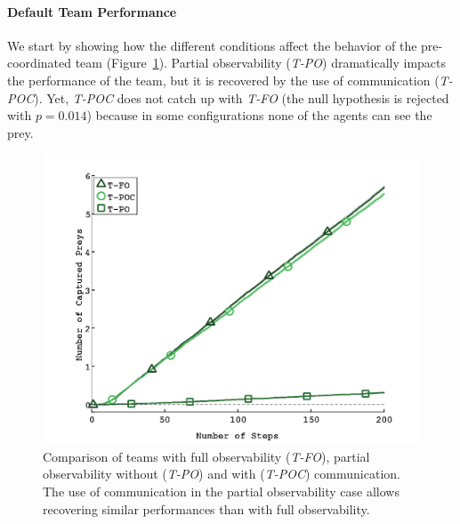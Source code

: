 
\paragraph{Default Team Performance}

We start by showing how the different conditions affect the behavior of the pre-coordinated team (Figure~\ref{fig:cmpteam}). Partial observability (\emph{T-PO}) dramatically impacts the performance of the team, but it is recovered by the use of communication (\emph{T-POC}). Yet, \emph{T-POC} does not catch up with \emph{T-FO} (the null hypothesis is rejected with {\small$p=0.014$}) because in some configurations none of the agents can see the prey. %


\begin{figure}[htbp!]
  \centering
  \includegraphics[trim=2.6cm 0.4cm 2.7cm 1.8cm, clip=true, width=0.8\columnwidth]{plots/with_noise/teamComparaison.png}
  \caption{Comparison of teams with full observability (\emph{T-FO}), partial observability without (\emph{T-PO}) and with (\emph{T-POC}) communication. The use of communication in the partial observability case allows recovering similar performances than with full observability.}
  \label{fig:cmpteam}
\end{figure}


